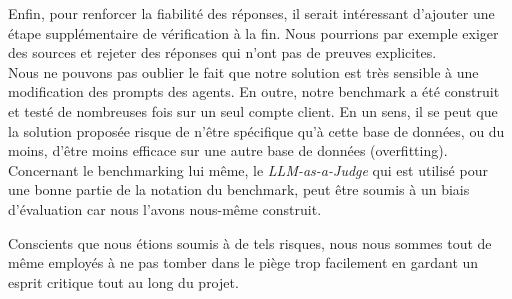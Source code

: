Enfin, pour renforcer la fiabilité des réponses, il serait intéressant d'ajouter une étape supplémentaire de vérification à la fin. Nous pourrions par exemple exiger des sources et rejeter des réponses qui n'ont pas de preuves explicites.
\\

Nous ne pouvons pas oublier le fait que notre solution est très sensible à une modification des prompts des agents. En outre, notre benchmark a été construit et testé de nombreuses fois sur un seul compte client. En un sens, il se peut que la solution proposée risque de n'être spécifique qu'à cette base de données, ou du moins, d'être moins efficace sur une autre base de données (overfitting). Concernant le benchmarking lui même, le \textit{LLM-as-a-Judge} qui est utilisé pour une bonne partie de la notation du benchmark, peut être soumis à un biais d'évaluation car nous l'avons nous-même construit. 

Conscients que nous étions soumis à de tels risques, nous nous sommes tout de même employés à ne pas tomber dans le piège trop facilement en gardant un esprit critique tout au long du projet.